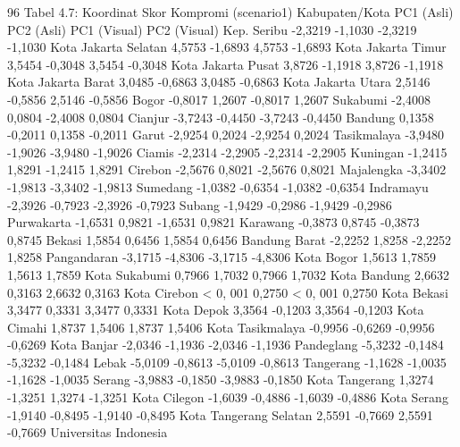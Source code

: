 96
Tabel 4.7: Koordinat Skor Kompromi (scenario1)
Kabupaten/Kota PC1 (Asli) PC2 (Asli) PC1 (Visual) PC2 (Visual)
Kep. Seribu -2,3219 -1,1030 -2,3219 -1,1030
Kota Jakarta Selatan 4,5753 -1,6893 4,5753 -1,6893
Kota Jakarta Timur 3,5454 -0,3048 3,5454 -0,3048
Kota Jakarta Pusat 3,8726 -1,1918 3,8726 -1,1918
Kota Jakarta Barat 3,0485 -0,6863 3,0485 -0,6863
Kota Jakarta Utara 2,5146 -0,5856 2,5146 -0,5856
Bogor -0,8017 1,2607 -0,8017 1,2607
Sukabumi -2,4008 0,0804 -2,4008 0,0804
Cianjur -3,7243 -0,4450 -3,7243 -0,4450
Bandung 0,1358 -0,2011 0,1358 -0,2011
Garut -2,9254 0,2024 -2,9254 0,2024
Tasikmalaya -3,9480 -1,9026 -3,9480 -1,9026
Ciamis -2,2314 -2,2905 -2,2314 -2,2905
Kuningan -1,2415 1,8291 -1,2415 1,8291
Cirebon -2,5676 0,8021 -2,5676 0,8021
Majalengka -3,3402 -1,9813 -3,3402 -1,9813
Sumedang -1,0382 -0,6354 -1,0382 -0,6354
Indramayu -2,3926 -0,7923 -2,3926 -0,7923
Subang -1,9429 -0,2986 -1,9429 -0,2986
Purwakarta -1,6531 0,9821 -1,6531 0,9821
Karawang -0,3873 0,8745 -0,3873 0,8745
Bekasi 1,5854 0,6456 1,5854 0,6456
Bandung Barat -2,2252 1,8258 -2,2252 1,8258
Pangandaran -3,1715 -4,8306 -3,1715 -4,8306
Kota Bogor 1,5613 1,7859 1,5613 1,7859
Kota Sukabumi 0,7966 1,7032 0,7966 1,7032
Kota Bandung 2,6632 0,3163 2,6632 0,3163
Kota Cirebon < 0, 001 0,2750 < 0, 001 0,2750
Kota Bekasi 3,3477 0,3331 3,3477 0,3331
Kota Depok 3,3564 -0,1203 3,3564 -0,1203
Kota Cimahi 1,8737 1,5406 1,8737 1,5406
Kota Tasikmalaya -0,9956 -0,6269 -0,9956 -0,6269
Kota Banjar -2,0346 -1,1936 -2,0346 -1,1936
Pandeglang -5,3232 -0,1484 -5,3232 -0,1484
Lebak -5,0109 -0,8613 -5,0109 -0,8613
Tangerang -1,1628 -1,0035 -1,1628 -1,0035
Serang -3,9883 -0,1850 -3,9883 -0,1850
Kota Tangerang 1,3274 -1,3251 1,3274 -1,3251
Kota Cilegon -1,6039 -0,4886 -1,6039 -0,4886
Kota Serang -1,9140 -0,8495 -1,9140 -0,8495
Kota Tangerang Selatan 2,5591 -0,7669 2,5591 -0,7669
Universitas Indonesia

